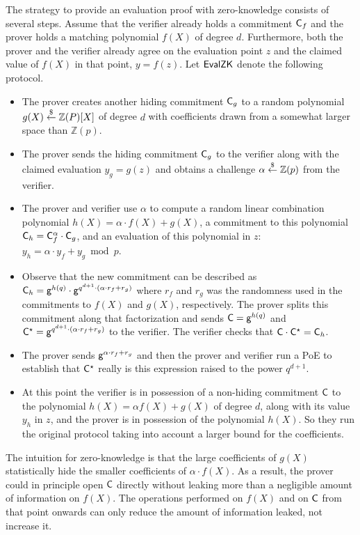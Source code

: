 The strategy to provide an evaluation proof with zero-knowledge consists of several steps. Assume that the verifier already holds a commitment $\mathsf{C}_f$ and the prover holds a matching polynomial $f(X)$ of degree $d$. Furthermore, both the prover and the verifier already agree on the evaluation point $z$ and the claimed value of $f(X)$ in that point, $y = f(z)$. Let $\textsf{{EvalZK}}$ denote the following protocol.
\begin{itemize}
\item The prover creates another hiding commitment $\mathsf{C}_g$ to a random polynomial $g(X) \overset{\$}{\gets} \mathbb{Z}(P)[X]$ of degree $d$ with coefficients drawn from a somewhat larger space than $\mathbb{Z}(p)$.
\item The prover sends the hiding commitment $\mathsf{C}_g$ to the verifier along with the claimed evaluation $y_g = g(z)$ and obtains a challenge $\alpha \overset{\$}{\gets} \mathbb{Z}(p)$ from the verifier.
\item The prover and verifier use $\alpha$ to compute a random linear combination polynomial $h(X) = \alpha \cdot f(X) + g(X)$, a commitment to this polynomial $\mathsf{C}_h = \mathsf{C}_f^\alpha \cdot \mathsf{C}_g$, and an evaluation of this polynomial in $z$: $y_h = \alpha \cdot y_f + y_g \bmod p$.
\item Observe that the new commitment can be described as $\mathsf{C}_h = \mathsf{g}^{h(q)} \cdot \mathsf{g}^{q^{d+1} \cdot (\alpha \cdot r_f + r_g)}$ where $r_f$ and $r_g$ was the randomness used in the commitments to $f(X)$ and $g(X)$, respectively. The prover splits this commitment along that factorization and sends $\mathsf{C} = \mathsf{g}^{h(q)}$ and $\mathsf{C}^\star = \mathsf{g}^{q^{d+1} \cdot (\alpha \cdot r_f + r_g)}$ to the verifier. The verifier checks that $\mathsf{C} \cdot \mathsf{C}^\star = \mathsf{C}_h$.
\item The prover sends $\mathsf{g}^{\alpha \cdot r_f + r_g}$ and then the prover and verifier run a \textsf{PoE} to establish that $\mathsf{C}^\star$ really is this expression raised to the power $q^{d+1}$.
\item At this point the verifier is in possession of a non-hiding commitment $\mathsf{C}$ to the polynomial $h(X) = \alpha f(X) + g(X)$ of degree $d$, along with its value $y_h$ in $z$, and the prover is in possession of the polynomial $h(X)$. So they run the original \eval protocol taking into account a larger bound for the coefficients.
\end{itemize}

The intuition for zero-knowledge is that the large coefficients of $g(X)$ statistically hide the smaller coefficients of $\alpha \cdot f(X)$. As a result, the prover could in principle open $\mathsf{C}$ directly without leaking more than a negligible amount of information on $f(X)$. The operations performed on $f(X)$ and on $\mathsf{C}$ from that point onwards can only reduce the amount of information leaked, not increase it.


